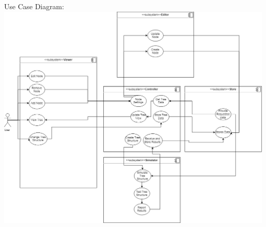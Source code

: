 \documentclass{article}
\begin{document}
  \newline \newline 
  Use Case Diagram:
  \includegraphics[width=\textwidth]{TriiUseCaseDiagram}
\end{document}
